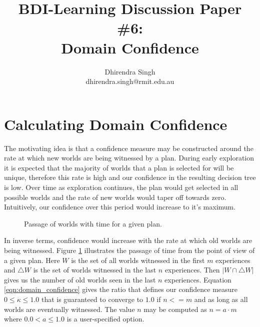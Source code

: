 \documentclass[a4paper]{article}
\title{BDI-Learning Discussion Paper \#6:\\Domain Confidence}
\author{
Dhirendra Singh\\dhirendra.singh@rmit.edu.au
}
\begin{document}

\maketitle


\section*{Calculating Domain Confidence}

The motivating idea is that a confidence measure may be constructed around the rate at which new worlds are being witnessed by a plan. During early exploration it is expected that the majority of worlds that a plan is selected for will be unique, therefore this rate is high and our confidence in the resulting decision tree is low. Over time as exploration continues, the plan would get selected in all possible worlds and the rate of new worlds would taper off towards zero. Intuitively, our confidence over this period would increase to it's maximum. 

\begin{figure}[ht]
\begin{center}
\end{center}
\caption{Passage of worlds with time for a given plan.}
\label{fig:domain_confidence}
\end{figure}

In inverse terms, confidence would increase with the rate at which old worlds are being witnessed. Figure \ref{fig:domain_confidence} illustrates the passage of time from the point of view of a given plan. Here $W$ is the set of all worlds witnessed in the first $m$ experiences and $\triangle W$ is the set of worlds witnessed in the last $n$ experiences. Then $|W \cap \triangle W|$ gives us the number of old worlds seen in the last $n$ experiences. Equation \ref{eqn:domain_confidence} gives the ratio that defines our confidence measure $0 \leq \kappa \leq 1.0$ that is guaranteed to converge to $1.0$ if $n<=m$ and as long as all worlds are eventually witnessed. The value $n$ may be computed as $n=a \cdot m$ where $0.0 < a \leq 1.0$ is a user-specified option.
\end{document}
